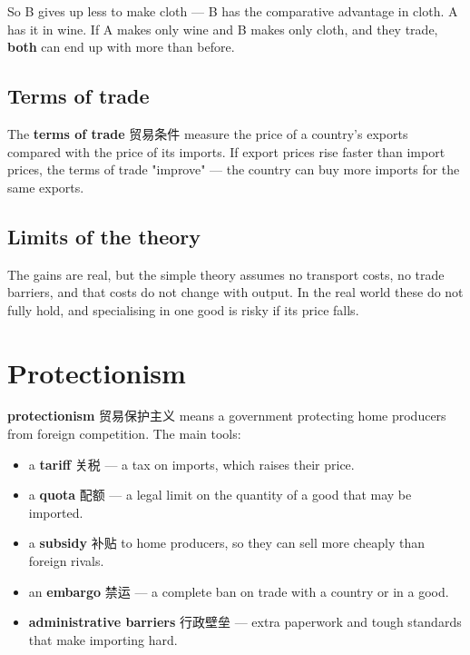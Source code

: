 \documentclass[11pt]{article}
\begin{document}
So B gives up less to make cloth — B has the comparative advantage in cloth. A has it in wine. If A makes only wine and B makes only cloth, and they trade, \textbf{both} can end up with more than before.

\subsection*{Terms of trade}

The \textbf{terms of trade} 贸易条件 measure the price of a country's exports compared with the price of its imports. If export prices rise faster than import prices, the terms of trade "improve" — the country can buy more imports for the same exports.

\subsection*{Limits of the theory}

The gains are real, but the simple theory assumes no transport costs, no trade barriers, and that costs do not change with output. In the real world these do not fully hold, and specialising in one good is risky if its price falls.

\section*{Protectionism}

\textbf{protectionism} 贸易保护主义 means a government protecting home producers from foreign competition. The main tools:

\begin{itemize}
\item a \textbf{tariff} 关税 — a tax on imports, which raises their price.

\item a \textbf{quota} 配额 — a legal limit on the quantity of a good that may be imported.

\item a \textbf{subsidy} 补贴 to home producers, so they can sell more cheaply than foreign rivals.

\item an \textbf{embargo} 禁运 — a complete ban on trade with a country or in a good.

\item \textbf{administrative barriers} 行政壁垒 — extra paperwork and tough standards that make importing hard.

\end{itemize}
\end{document}
